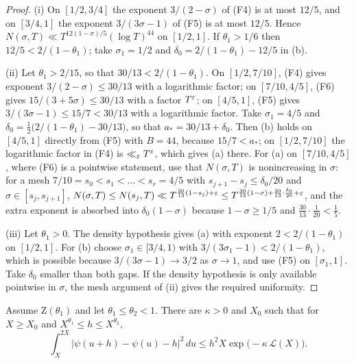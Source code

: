 \begin{proof}
(i) On $[1/2,3/4]$ the exponent $3/(2-\sigma)$ of (F4) is at most $12/5$, and on $[3/4,1]$ the exponent
$3/(3\sigma-1)$ of (F5) is at most $12/5$. Hence $N(\sigma,T)\ll T^{12(1-\sigma)/5}(\log T)^{44}$ on $[1/2,1]$.
If $\theta_1>1/6$ then $12/5<2/(1-\theta_1)$; take $\sigma_1=1/2$ and $\delta_0=2/(1-\theta_1)-12/5$ in (b).

(ii) Let $\theta_1>2/15$, so that $30/13<2/(1-\theta_1)$. On $[1/2,7/10]$, (F4) gives exponent
$3/(2-\sigma)\le30/13$ with a logarithmic factor; on $[7/10,4/5]$, (F6) gives $15/(3+5\sigma)\le30/13$ with a
factor $T^\varepsilon$; on $[4/5,1]$, (F5) gives $3/(3\sigma-1)\le 15/7<30/13$ with a logarithmic factor. Take
$\sigma_1=4/5$ and $\delta_0=\tfrac12\bigl(2/(1-\theta_1)-30/13\bigr)$, so that $a_*=30/13+\delta_0$. Then (b) holds on
$[4/5,1]$ directly from (F5) with $B=44$, because $15/7<a_*$; on $[1/2,7/10]$ the logarithmic factor in (F4) is
$\ll_\varepsilon T^\varepsilon$, which gives (a) there. For (a) on $[7/10,4/5]$, where (F6) is a pointwise statement, use that $N(\sigma,T)$ is nonincreasing in
$\sigma$: for a mesh $7/10=s_0<s_1<\dots<s_r=4/5$ with $s_{j+1}-s_j\le\delta_0/20$ and $\sigma\in[s_j,s_{j+1}]$,
$N(\sigma,T)\le N(s_j,T)\ll T^{\frac{30}{13}(1-s_j)+\varepsilon}\le T^{\frac{30}{13}(1-\sigma)+\frac{30}{13}\cdot\frac{\delta_0}{20}+\varepsilon}$, and the extra
exponent is absorbed into $\delta_0(1-\sigma)$ because $1-\sigma\ge1/5$ and $\frac{30}{13}\cdot\frac1{20}<\frac15$.

(iii) Let $\theta_1>0$. The density hypothesis gives (a) with exponent $2<2/(1-\theta_1)$ on $[1/2,1]$. For (b)
choose $\sigma_1\in[3/4,1)$ with $3/(3\sigma_1-1)<2/(1-\theta_1)$, which is possible because $3/(3\sigma-1)\to3/2$ as
$\sigma\to1$, and use (F5) on $[\sigma_1,1]$. Take $\delta_0$ smaller than both gaps. If the density hypothesis is
only available pointwise in $\sigma$, the mesh argument of (ii) gives the required uniformity.
\end{proof}

\begin{proposition}\label{prop:ms}
Assume $\mathrm Z(\theta_1)$ and let $\theta_1\le\theta_2<1$. There are $\kappa>0$ and $X_0$ such that for
$X\ge X_0$ and $X^{\theta_1}\le h\le X^{\theta_2}$,
\[
 \int_X^{2X}\bigl|\psi(u+h)-\psi(u)-h\bigr|^2\,du\le h^2X\exp\bigl(-\kappa\,\mathcal L(X)\bigr).
\]
\end{proposition}

